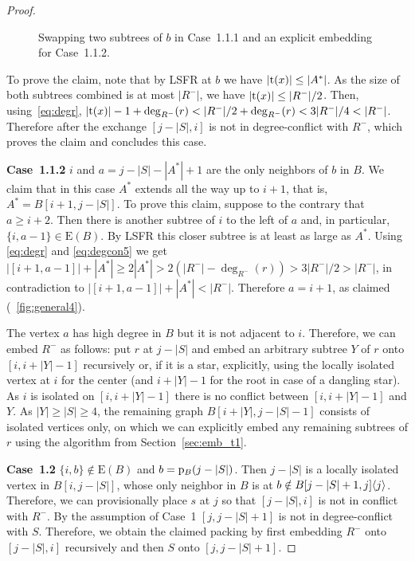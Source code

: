 \documentclass[11pt,a4paper,colorlinks=true,urlcolor=blue,citecolor=red]{article}
\theoremstyle{plain}
\newcommand{\case}[1]{\par\vspace{.5\baselineskip}\noindent\textbf{\sffamily Case~#1}}
\newcommand{\EB}{\mathrm{E}(B)}
\begin{document}
\begin{proof}
  \begin{figure}[htbp]
\hfill
    \hfill
    \caption{Swapping two subtrees of $b$ in Case~1.1.1 and an explicit
      embedding for Case~1.1.2.\label{fig:general3}}
  \end{figure}

  To prove the claim, note that by LSFR at $b$ we have
  $|\mathrm t(x)|\le|A^*|$. As the size of both subtrees combined is at most
  $|R^-|$, we have $|\mathrm t(x)|\le|R^-|/2$.  Then, using~\eqref{eq:degr},
  $|\tr(x)|-1+\deg_{R^-}(r)< |R^-|/2+\deg_{R^-}(r)< 3|R^-|/4<|R^-|$.
  Therefore after the exchange $[j-|S|,i]$ is not in degree-conflict
  with $R^-$, which proves the claim and concludes this case.

  \case{1.1.2} $i$ and $a=j-|S|-|A^*|+1$ are the only neighbors of $b$
  in $B$. We claim that in this case $A^*$ extends all the way up to
  $i+1$, that is, $A^*= B[i+1,j-|S|]$.
  To prove this claim, suppose to the contrary that $a\ge i+2$. Then
  there is another subtree of $i$ to the left of $a$ and, in particular,
  $\{i,a-1\}\in\EB$. By LSFR this closer subtree is at least as large as $A^*$. Using \eqref{eq:degr} and
  \eqref{eq:degcon5} we get
  $|[i+1,a-1]|+|A^*|\ge 2|A^*|>2(|R^-|-\deg_{R^-}(r))>3|R^-|/2>|R^-|$,
  in contradiction to $|[i+1,a-1]|+|A^*|<|R^-|$. Therefore $a=i+1$, as
  claimed (\figurename~\ref{fig:general4}).

  The vertex $a$ has high degree in $B$ but it is not adjacent to
  $i$. Therefore, we can embed $R^-$ as follows: put $r$ at $j-|S|$ and
  embed an arbitrary subtree $Y$ of $r$ onto $[i,i+|Y|-1]$ recursively
  or, if it is a star, explicitly, using the locally isolated vertex at
  $i$ for the center (and $i+|Y|-1$ for the root in case of a dangling
  star). As $i$ is isolated on $[i,i+|Y|-1]$ there is no conflict between $[i,i+|Y|-1]$
  and $Y$. As $|Y|\ge|S|\ge 4$, the remaining graph $B[i+|Y|,j-|S|-1]$
  consists of isolated vertices only, on which we can explicitly embed
  any remaining subtrees of $r$ using the algorithm from
  Section~\ref{sec:emb_t1}.


  \case{1.2} $\{i,b\}\notin\EB$ and $b=\mathrm p_B(j-|S|)$. Then $j-|S|$ is a
  locally isolated vertex in $B[i,j-|S|]$, whose only neighbor in $B$ is
  at $b\notin B{[j-|S|+1,j]}\langle{j}\rangle$. Therefore, we can provisionally
  place $s$ at $j$ so that $[j-|S|,i]$ is not in conflict with $R^-$. By the assumption
  of Case~1 $[j,j-|S|+1]$ is not in degree-conflict with $S$. Therefore, we obtain
  the claimed packing by first embedding $R^-$ onto $[j-|S|,i]$
  recursively and then $S$ onto $[j,j-|S|+1]$.


\end{proof}
\end{document}
